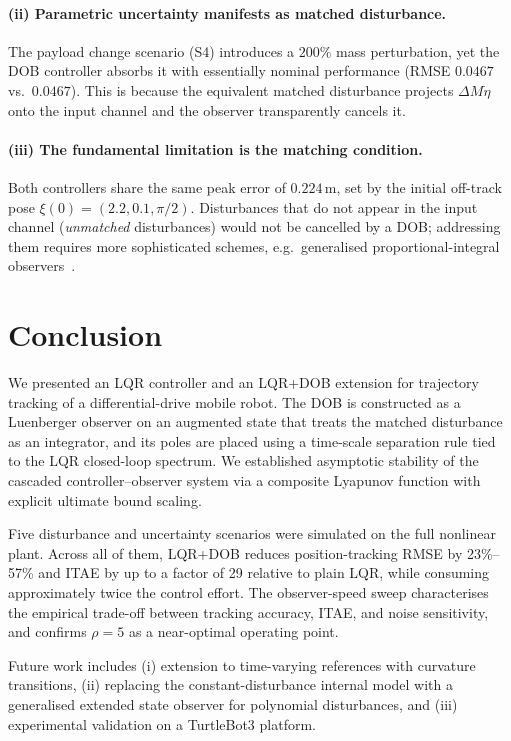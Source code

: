 \documentclass[conference]{IEEEtran}
\begin{document}
\paragraph*{(ii) Parametric uncertainty manifests as matched disturbance.}
The payload change scenario (S4) introduces a $200\%$ mass perturbation,
yet the DOB controller absorbs it with essentially nominal performance
(RMSE $0.0467$ vs.\ $0.0467$). This is because the equivalent matched
disturbance projects $\Delta M\dot\eta$ onto the input channel and the
observer transparently cancels it.

\paragraph*{(iii) The fundamental limitation is the matching condition.}
Both controllers share the same peak error of $0.224$\,m, set by the
initial off-track pose $\xi(0)=(2.2,0.1,\pi/2)$. Disturbances that do not
appear in the input channel (\emph{unmatched} disturbances) would not be
cancelled by a DOB; addressing them requires more sophisticated schemes,
e.g.\ generalised proportional-integral observers~\cite{li2012generalized}.

\section{Conclusion}\label{sec:conclusion}

We presented an LQR controller and an LQR+DOB extension for trajectory
tracking of a differential-drive mobile robot. The DOB is constructed as
a Luenberger observer on an augmented state that treats the matched
disturbance as an integrator, and its poles are placed using a
time-scale separation rule tied to the LQR closed-loop spectrum. We
established asymptotic stability of the cascaded controller--observer
system via a composite Lyapunov function with explicit ultimate bound
scaling.

Five disturbance and uncertainty scenarios were simulated on the full
nonlinear plant. Across all of them, LQR+DOB reduces position-tracking
RMSE by 23\%--57\% and ITAE by up to a factor of 29 relative to plain
LQR, while consuming approximately twice the control effort. The
observer-speed sweep characterises the empirical trade-off between
tracking accuracy, ITAE, and noise sensitivity, and confirms $\rho\!=\!5$
as a near-optimal operating point.

Future work includes (i) extension to time-varying references with
curvature transitions, (ii) replacing the constant-disturbance internal
model with a generalised extended state observer for polynomial
disturbances, and (iii) experimental validation on a TurtleBot3 platform.
\end{document}
